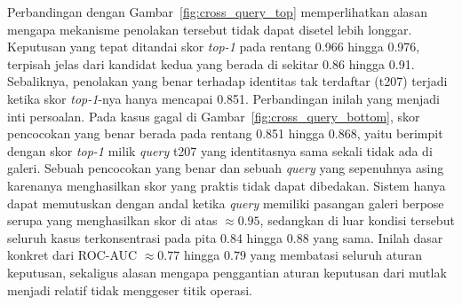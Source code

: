 Perbandingan dengan Gambar~\ref{fig:cross_query_top} memperlihatkan alasan mengapa
mekanisme penolakan tersebut tidak dapat disetel lebih longgar. Keputusan yang tepat
ditandai skor \textit{top-1} pada rentang 0.966 hingga 0.976, terpisah jelas dari kandidat
kedua yang berada di sekitar 0.86 hingga 0.91. Sebaliknya, penolakan yang benar terhadap
identitas tak terdaftar (t207) terjadi ketika skor \textit{top-1}-nya hanya mencapai 0.851.
Perbandingan inilah yang menjadi inti persoalan. Pada kasus gagal di
Gambar~\ref{fig:cross_query_bottom}, skor pencocokan yang benar berada pada rentang 0.851
hingga 0.868, yaitu berimpit dengan skor \textit{top-1} milik \textit{query} t207 yang
identitasnya sama sekali tidak ada di galeri. Sebuah pencocokan yang benar dan sebuah
\textit{query} yang sepenuhnya asing karenanya menghasilkan skor yang praktis tidak dapat
dibedakan. Sistem hanya dapat memutuskan dengan andal ketika \textit{query} memiliki
pasangan galeri berpose serupa yang menghasilkan skor di atas $\approx 0{.}95$, sedangkan
di luar kondisi tersebut seluruh kasus terkonsentrasi pada pita 0.84 hingga 0.88 yang sama.
Inilah dasar konkret dari ROC-AUC $\approx 0{.}77$ hingga $0{.}79$ yang membatasi seluruh
aturan keputusan, sekaligus alasan mengapa penggantian aturan keputusan dari mutlak menjadi
relatif tidak menggeser titik operasi.